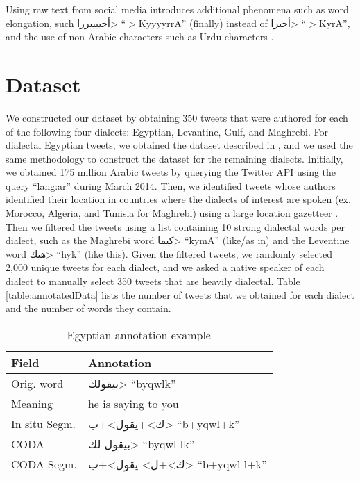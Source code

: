 \documentclass[11pt,letterpaper]{article}
\begin{document}
Using raw text from social media introduces additional phenomena such as word elongation, such \<أخييييررا> ``$>$KyyyyrrA'' (finally) instead of \<أخيرا> ``$>$KyrA'', and the use of non-Arabic characters such as Urdu characters \cite{darwish2012language}.




\section{Dataset}
\label{sec:dataset}
  We constructed our dataset by obtaining 350 tweets that were authored for each of the following four dialects: Egyptian, Levantine, Gulf, and Maghrebi. For dialectal Egyptian tweets, we obtained the dataset described in \cite{darwish2014verifiably}, and we used the same methodology to construct the dataset for the remaining dialects. Initially, we obtained 175 million Arabic tweets by querying the Twitter API using the query ``lang:ar'' during March 2014.  Then, we identified tweets whose authors identified their location in countries where the dialects of interest are spoken (ex. Morocco, Algeria, and Tunisia for Maghrebi) using a large location gazetteer \cite{mubarak2014using}.  Then we filtered the tweets using a list containing 10 strong dialectal words per dialect, such as the Maghrebi word \<كيما> ``kymA'' (like/as in) and the Leventine word \<هيك> ``hyk'' (like this).  Given the filtered tweets, we randomly selected 2,000 unique tweets for each dialect, and we asked a native speaker of each dialect to manually select 350 tweets that are heavily dialectal.  Table \ref{table:annotatedData} lists the number of tweets that we obtained for each dialect and the number of words they contain.  




\begin{table}[h]
\begin{center}
\begin{tabular}{|l|l|}
\hline \bf Field & \bf Annotation \\ \hline
Orig. word & \<بيقولك> ``byqwlk''\\
Meaning & he is saying to you \\
In situ Segm. & \<ك>+\<يقول>+\<ب> ``b+yqwl+k''\\
CODA & \<بيقول لك> ``byqwl lk''\\
CODA Segm. & \<ك>+\<ل> \<يقول>+\<ب> ``b+yqwl l+k''\\
\hline
\end{tabular}
\end{center}
\caption{Egyptian annotation example}
\vspace{-1.5em}
\label{annotations}
\end{table}
\end{document}

